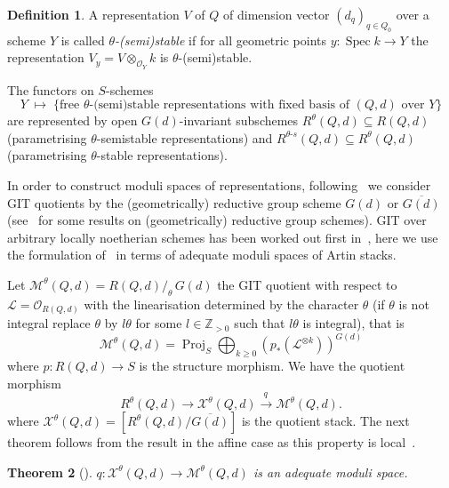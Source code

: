 \documentclass[10pt,a4paper]{amsart}
\newtheorem{theo}{Theorem}[section]
\theoremstyle{definition}
\newtheorem{defi}[theo]{Definition}
\def\Z{\mathds Z}
\def\O{\mathcal O}
\DeclareMathOperator{\Spec}{Spec}
\DeclareMathOperator{\Proj}{Proj}
\begin{document}
\begin{defi}
A representation $V$ of $Q$ of dimension vector $(d_q)_{q\in Q_0}$
over a scheme $Y$ is called {\it $\theta$-(semi)stable} if for all geometric points 
$y\colon\Spec k\to Y$ the representation $V_y=V\otimes_{\O_Y} k$ is 
$\theta$-(semi)stable.
\end{defi}

The functors on $S$-schemes 
\[
Y\;\mapsto\;\big\{\text{free $\theta$-(semi)stable representations with fixed 
basis of $(Q,d)$ over $Y$}\big\}
\]
are represented by open $G(d)$-invariant subschemes $R^\theta(Q,d)\!\subseteq\!R(Q,d)$
(parametrising $\theta$-semistable representations) and 
$R^{\theta\text{-}s}(Q,d)\!\subseteq\!R^\theta(Q,d)$ (parametrising $\theta$-stable
representations).


In order to construct moduli spaces of representations, following~\cite{Ki94} we 
consider GIT quotients by the (geometrically) reductive group scheme $G(d)$ or 
$\overline{G(d)}$ (see~ for some results on 
(geometrically) reductive group schemes). %
GIT over arbitrary locally noetherian schemes has been worked out first in~\cite{Ses77}, 
here we use the formulation of~\cite{Al14} in terms of adequate moduli spaces 
of Artin stacks.


Let $\mathcal M^\theta(Q,d)=R(Q,d)/_{\!\theta}\,G(d)$ 
the GIT quotient with respect to $\mathscr L=\O_{R(Q,d)}$ 
with the linearisation determined by the character $\theta$
(if $\theta$ is not integral replace $\theta$ by $l\theta$ for some $l\in\Z_{>0}$
such that $l\theta$ is integral), that is
\[\textstyle
\mathcal M^\theta(Q,d)
=\Proj_S\bigoplus_{k\geq 0}(p_*(\mathscr L^{\otimes k}))^{G(d)}
\]
where $p\colon R(Q,d)\to S$ is the structure morphism. We have the quotient morphism 
\[
R^\theta(Q,d)\to\mathcal X^\theta(Q,d)\stackrel{q\,}{\to}\mathcal M^\theta(Q,d).
\] 
where $\mathcal X^\theta(Q,d)=[R^\theta(Q,d)/\overline{G(d)}]$ is the 
quotient stack. The next theorem follows from the result in the affine case
\cite[Thm.~9.1.4]{Al14} as this property is local~\cite[Prop.~5.2.9]{Al14}.

\begin{theo}[\cite{Al14}]\label{thm:adequatemodulispace}
$q\colon\mathcal X^\theta(Q,d)\to\mathcal M^\theta(Q,d)$
is an adequate moduli space.
\end{theo}
\end{document}
